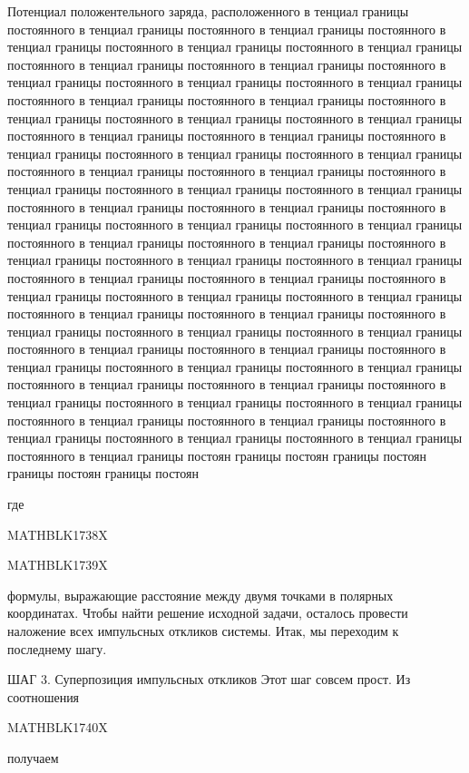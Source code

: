 \documentclass[
]{article}
\begin{document}
{{{Потенциал положентельного заряда, расположенного в тенциал границы
постоянного в тенциал границы постоянного в тенциал границы постоянного
в тенциал границы постоянного в тенциал границы постоянного в тенциал
границы постоянного в тенциал границы постоянного в тенциал границы
постоянного в тенциал границы постоянного в тенциал границы постоянного
в тенциал границы постоянного в тенциал границы постоянного в тенциал
границы постоянного в тенциал границы постоянного в тенциал границы
постоянного в тенциал границы постоянного в тенциал границы постоянного
в тенциал границы постоянного в тенциал границы постоянного в тенциал
границы постоянного в тенциал границы постоянного в тенциал границы
постоянного в тенциал границы постоянного в тенциал границы постоянного
в тенциал границы постоянного в тенциал границы постоянного в тенциал
границы постоянного в тенциал границы постоянного в тенциал границы
постоянного в тенциал границы постоянного в тенциал границы постоянного
в тенциал границы постоянного в тенциал границы постоянного в тенциал
границы постоянного в тенциал границы постоянного в тенциал границы
постоянного в тенциал границы постоянного в тенциал границы постоянного
в тенциал границы постоянного в тенциал границы постоянного в тенциал
границы постоянного в тенциал границы постоянного в тенциал границы
постоянного в тенциал границы постоянного в тенциал границы постоянного
в тенциал границы постоянного в тенциал границы постоянного в тенциал
границы постоянного в тенциал границы постоянного в тенциал границы
постоянного в тенциал границы постоянного в тенциал границы постоянного
в тенциал границы постоянного в тенциал границы постоянного в тенциал
границы постоянного в тенциал границы постоянного в тенциал границы
постоянного в тенциал границы постоянного в тенциал границы постоянного
в тенциал границы постоянного в тенциал границы постоянного в тенциал
границы постоян границы постоян границы постоян границы постоян границы
постоян

где

MATHBLK1738X

MATHBLK1739X

формулы, выражающие расстояние между двумя точками в полярных
координатах. Чтобы найти решение исходной задачи, осталось провести
наложение всех импульсных откликов системы. Итак, мы переходим к
последнему шагу.

ШАГ 3. Суперпозиция импульсных откликов Этот шаг совсем прост. Из
соотношения

MATHBLK1740X

получаем

}}}
\end{document}
